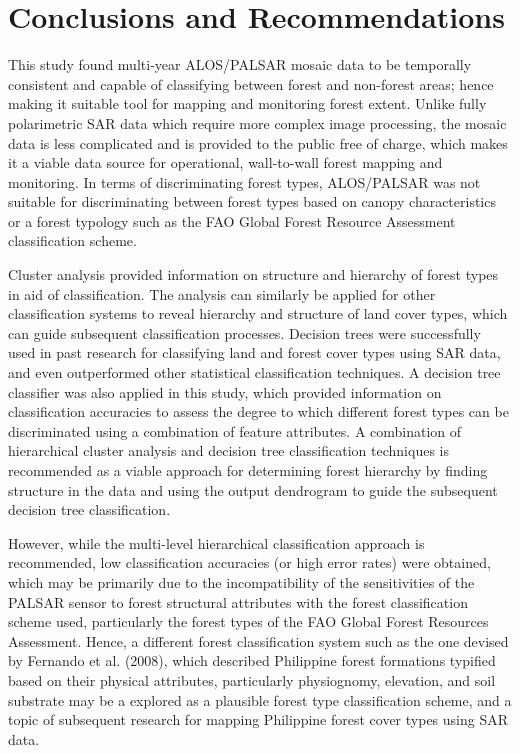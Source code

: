 
\chapter{Conclusions and Recommendations}
\label{cha: conclusions}

This study found multi-year ALOS/PALSAR mosaic data to be temporally consistent and capable of classifying between forest and non-forest areas; hence making it suitable tool for mapping and monitoring forest extent. Unlike fully polarimetric SAR data which require more complex image processing, the mosaic data is less complicated and is provided to the public free of charge, which makes it a viable data source for operational, wall-to-wall forest mapping and monitoring. In terms of discriminating forest types, ALOS/PALSAR was not suitable for discriminating between forest types based on canopy characteristics or a forest typology such as the FAO Global Forest Resource Assessment classification scheme.

Cluster analysis provided information on structure and hierarchy of forest types in aid of classification. The analysis can similarly be applied for other classification systems to reveal hierarchy and structure of land cover types, which can guide subsequent classification processes. Decision trees were successfully used in past research for classifying land and forest cover types using SAR data, and even outperformed other statistical classification techniques. A decision tree classifier was also applied in this study, which provided information on classification accuracies to assess the degree to which different forest types can be discriminated using a combination of feature attributes. A combination of hierarchical cluster analysis and decision tree classification techniques is recommended as a viable approach for determining forest hierarchy by finding structure in the data and using the output dendrogram to guide the subsequent decision tree classification.

However, while the multi-level hierarchical classification approach is recommended, low classification accuracies (or high error rates) were obtained, which may be primarily due to the incompatibility of the sensitivities of the PALSAR sensor to forest structural attributes with the forest classification scheme used, particularly the forest types of the FAO Global Forest Resources Assessment. Hence, a different forest classification system such as the one devised by Fernando et al. (2008), which described Philippine forest formations typified based on their physical attributes, particularly physiognomy, elevation, and soil substrate may be a explored as a plausible forest type classification scheme, and a topic of subsequent research for mapping Philippine forest cover types using SAR data.

